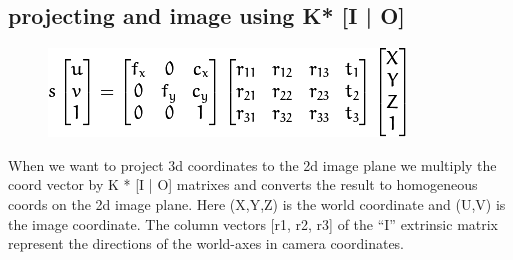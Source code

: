 \subsection{projecting and image using K* [I | O]}

\begin{figure}[H]
\centering
\includegraphics{pics/homogenious_projection.png}
\label{homogenious_projection}
\end{figure}

When we want to project 3d coordinates to the 2d image plane we multiply the
coord vector by K * [I | O] matrixes and converts the result to
homogeneous coords on the 2d image plane. Here (X,Y,Z) is the world
coordinate and (U,V) is the image coordinate. 
The column vectors [r1, r2, r3] of the “I” extrinsic matrix represent the
directions of the world-axes in camera coordinates.
